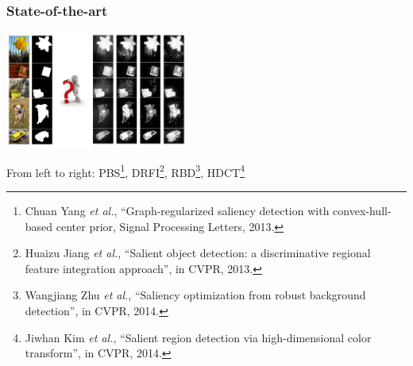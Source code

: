 \documentclass[notheorems,serif,table,compress]{beamer}  %
\begin{document}
\begin{frame}
\frametitle{State-of-the-art}
\centering\includegraphics[width=6cm]{latest}

  From left to right: PBS\footnote{Chuan Yang \textit{et al.}, ``Graph-regularized saliency detection with convex-hull-based center prior, Signal Processing Letters, 2013.}, DRFI\footnote{Huaizu Jiang \textit{et al.}, ``Salient object detection: a discriminative regional feature integration approach'', in CVPR, 2013.}, RBD\footnote{Wangjiang Zhu \textit{et al.}, ``Saliency optimization from robust background detection'', in CVPR, 2014.}, HDCT\footnote{Jiwhan Kim \textit{et al.}, ``Salient region detection via high-dimensional color transform'', in CVPR, 2014.}
\end{frame}
\end{document}
